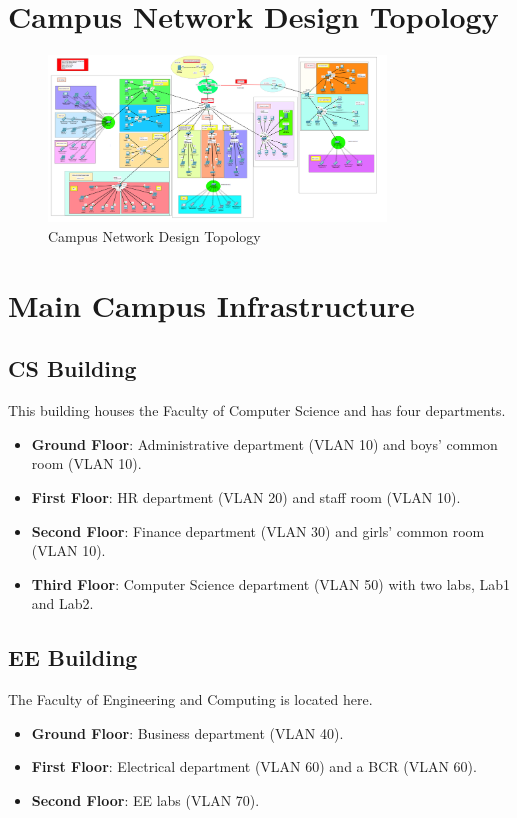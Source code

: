\documentclass[12pt]{article}
\begin{document}
\section{Campus Network Design Topology}
\begin{figure}[h]
    \centering
    \includegraphics[width=0.8\textwidth]{topo_CN.PNG} 
    \caption{Campus Network Design Topology}
\end{figure}

\section{Main Campus Infrastructure}
\subsection{CS Building}
This building houses the Faculty of Computer Science and has four departments. 
\begin{itemize}[label=--,leftmargin=*,parsep=0pt,itemsep=4pt]
    \item \textbf{Ground Floor}: Administrative department (VLAN 10) and boys' common room (VLAN 10).
    \item \textbf{First Floor}: HR department (VLAN 20) and staff room (VLAN 10).
    \item \textbf{Second Floor}: Finance department (VLAN 30) and girls' common room (VLAN 10).
    \item \textbf{Third Floor}: Computer Science department (VLAN 50) with two labs, Lab1 and Lab2.
\end{itemize}

\subsection{EE Building}
The Faculty of Engineering and Computing is located here.
\begin{itemize}[label=--,leftmargin=*,parsep=0pt,itemsep=4pt]
    \item \textbf{Ground Floor}: Business department (VLAN 40).
    \item \textbf{First Floor}: Electrical department (VLAN 60) and a BCR (VLAN 60).
    \item \textbf{Second Floor}: EE labs (VLAN 70).
\end{itemize}
\end{document}
